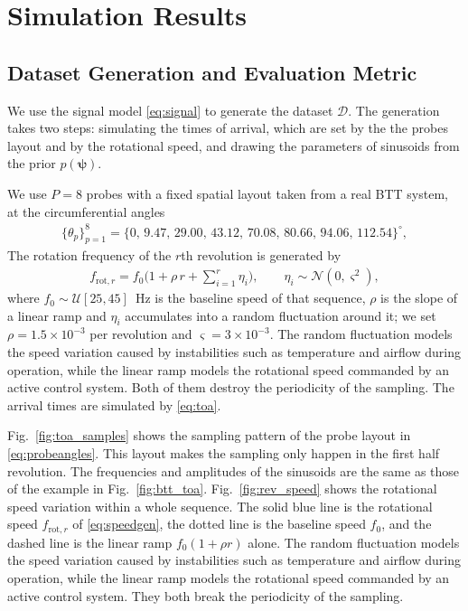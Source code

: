 \documentclass[journal,onecolumn]{IEEEtran}
\begin{document}
\section{Simulation Results}
\label{sec:exp}

\subsection{Dataset Generation and Evaluation Metric}
\label{sec:exp_setup}

We use the signal model \eqref{eq:signal} to generate the dataset $\mathcal{D}$. The generation takes two steps: simulating the times of arrival, which are set by the the probes layout and by the rotational speed, and drawing the parameters of sinusoids from the prior $p(\pmb{\psi})$.

We use $P=8$ probes with a fixed spatial layout taken from a real BTT system, at the circumferential angles
\begin{eqnarray}
\label{eq:probeangles}
\{\theta_p\}_{p=1}^{8}=\{0,\,9.47,\,29.00,\,43.12,\,70.08,\,80.66,\,94.06,\,112.54\}^\circ,
\end{eqnarray}
The rotation frequency of the $r$th revolution is generated by
\begin{eqnarray}
\label{eq:speedgen}
f_{\mathrm{rot},r}=f_0\Big(1+\rho\,r+\sum_{i=1}^{r}\eta_i\Big),
\qquad \eta_i\sim\mathcal{N}(0,\varsigma^2),
\end{eqnarray}
where $f_0\sim\mathcal{U}[25,45]$~Hz is the baseline speed of that sequence, $\rho$ is the slope of a linear ramp and $\eta_i$ accumulates into a random fluctuation around it; we set $\rho=1.5\times10^{-3}$ per revolution and $\varsigma=3\times10^{-3}$. The random fluctuation models the speed variation caused by instabilities such as temperature and airflow during operation, while the linear ramp models the rotational speed commanded by an active control system. Both of them destroy the periodicity of the sampling. The arrival times are simulated by \eqref{eq:toa}.

Fig.~\ref{fig:toa_samples} shows the sampling pattern of the probe layout in \eqref{eq:probeangles}. This layout makes the sampling only happen in the first half revolution. The frequencies and amplitudes of the sinusoids are the same as those of the example in Fig.~\ref{fig:btt_toa}.
Fig.~\ref{fig:rev_speed} shows the rotational speed variation within a whole sequence. The solid blue line is the rotational speed $f_{\mathrm{rot},r}$ of \eqref{eq:speedgen}, the dotted line is the baseline speed $f_0$, and the dashed line is the linear ramp $f_0(1+\rho r)$ alone. The random fluctuation models the speed variation caused by instabilities such as temperature and airflow during operation, while the linear ramp models the rotational speed commanded by an active control system. They both break the periodicity of the sampling.
\end{document}
